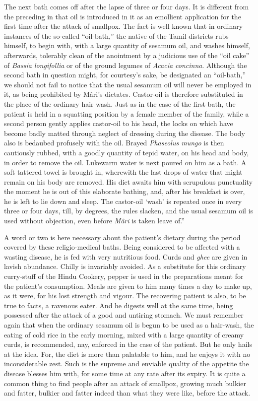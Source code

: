 \documentclass[a4paper, 12pt, oneside, english, twocolumn]{article}
\begin{document}
The next bath comes off after the lapse of three or four days. It is different from the preceding in that oil is introduced in it as an emollient application for the first time after the attack of smallpox. The fact is well known that in ordinary instances of the so-called ``oil-bath,'' the native of the Tamil districts rubs himself, to begin with, with a large quantity of sesamum oil, and washes himself, afterwards, tolerably clean of the anointment by a judicious use of the ``oil cake'' of \emph{Bassia longifollia} or of the ground legumes of \emph{Acacia concinna}. Although the second bath in question might, for courtesy's sake, be designated an ``oil-bath,'' we should not fail to notice that the usual sesamum oil will never be employed in it, as being prohibited by Mâri's dictates. Castor-oil is therefore substituted in the place of the ordinary hair wash. Just as in the case of the first bath, the patient is held in a squatting position by a female member of the family, while a second person gently applies castor-oil to his head, the locks on which have become badly matted through neglect of dressing during the disease. The body also is bedaubed profusely with the oil. Brayed \emph{Phaseolus mungo} is then cautiously rubbed, with a goodly quantity of tepid water, on his head and body, in order to remove the oil. Lukewarm water is next poured on him as a bath. A soft tattered towel is brought in, wherewith the last drops of water that might remain on his body are removed. His diet awaits him with scrupulous punctuality the moment he is out of this elaborate bathing, and, after his breakfast is over, he is left to lie down and sleep. The castor-oil `wash' is repeated once in every three or four days, till, by degrees, the rules slacken, and the usual sesamum oil is used without objection, even before \emph{Mâri} is taken leave of.''

A word or two is here necessary about the patient's dietary during the period covered by these religio-medical baths. Being considered to be affected with a wasting disease, he is fed with very nutritious food. Curds and \emph{ghee} are given in lavish abundance. Chilly is invariably avoided. As a substitute for this ordinary curry-stuff of the Hindu Cookery, pepper is used in the preparations meant for the patient's consumption. Meals are given to him many times a day to make up, as it were, for his lost strength and vigour. The recovering patient is also, to be true to facts, a ravenous eater. And he digests well at the same time, being possessed after the attack of a good and untiring stomach. We must remember again that when the ordinary sesamum oil is begun to be used as a hair-wash, the eating of cold rice in the early morning, mixed with a large quantity of creamy curds, is recommended, nay, enforced in the case of the patient. But he only hails at the idea. For, the diet is more than palatable to him, and he enjoys it with no inconsiderable zest. Such is the supreme and enviable quality of the appetite the disease blesses him with, for some time at any rate after its expiry. It is quite a common thing to find people after an attack of smallpox, growing much bulkier and fatter, bulkier and fatter indeed than what they were like, before the attack.
\end{document}
